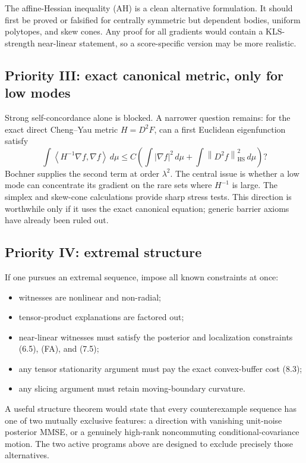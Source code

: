 \documentclass[11pt]{article}
\theoremstyle{definition}
\theoremstyle{remark}
\newcommand{\HS}{\mathrm{HS}}
\newcommand{\1}{\mathbf 1}
\newcommand{\dd}{\,d}
\newcommand{\ip}[2]{\left\langle #1,#2\right\rangle}
\newcommand{\norm}[1]{\left\lVert #1\right\rVert}
\begin{document}
The affine-Hessian inequality (AH) is a clean alternative formulation.
It should first be proved or falsified for centrally symmetric but
dependent bodies, uniform polytopes, and skew cones.  Any proof for all
gradients would contain a KLS-strength near-linear statement, so a
score-specific version may be more realistic.

\subsection{Priority III: exact canonical metric, only for low modes}

Strong self-concordance alone is blocked.  A narrower question remains:
for the exact direct Cheng--Yau metric \(H=D^2F\), can a first Euclidean
eigenfunction satisfy
\[
 \int\ip{H^{-1}\nabla f}{\nabla f}\dd\mu
 \le C\left(
 \int|\nabla f|^2\dd\mu+
 \int\norm{D^2f}_{\HS}^2\dd\mu\right)?              \tag{9.2}
\]
Bochner supplies the second term at order \(\lambda^2\).  The central
issue is whether a low mode can concentrate its gradient on the rare sets
where \(H^{-1}\) is large.  The simplex and skew-cone calculations provide
sharp stress tests.  This direction is worthwhile only if it uses the
exact canonical equation; generic barrier axioms have already been ruled
out.

\subsection{Priority IV: extremal structure}

If one pursues an extremal sequence, impose all known constraints at once:

\begin{itemize}
\item witnesses are nonlinear and non-radial;
\item tensor-product explanations are factored out;
\item near-linear witnesses must satisfy the posterior and localization
constraints (6.5), (FA), and (7.5);
\item any tensor stationarity argument must pay the exact convex-buffer
cost (8.3);
\item any slicing argument must retain moving-boundary curvature.
\end{itemize}

A useful structure theorem would state that every counterexample sequence
has one of two mutually exclusive features: a direction with vanishing
unit-noise posterior MMSE, or a genuinely high-rank noncommuting
conditional-covariance motion.  The two active programs above are designed
to exclude precisely those alternatives.
\end{document}
